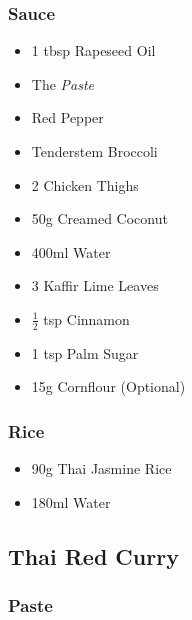 \documentclass[11pt, english]{article}
\begin{document}
                \subsubsection*{Sauce}

        \begin{itemize}
        \setlength\itemsep{0cm}
                \item 1 tbsp Rapeseed Oil
                \item The \textit{Paste}
                \item Red Pepper
		\item Tenderstem Broccoli
                \item 2 Chicken Thighs
                \item 50g Creamed Coconut
		\item 400ml Water
                \item 3 Kaffir Lime Leaves
		\item $\frac{1}{2}$ tsp Cinnamon
		\item 1 tsp Palm Sugar
		\item 15g Cornflour (Optional)
        \end{itemize}

                \subsubsection*{Rice}

        \begin{itemize}
        \setlength\itemsep{0cm}
                \item 90g Thai Jasmine Rice
                \item 180ml Water
        \end{itemize}

\newpage

	\subsection{Thai Red Curry}

		\subsubsection*{Paste}
\end{document}
